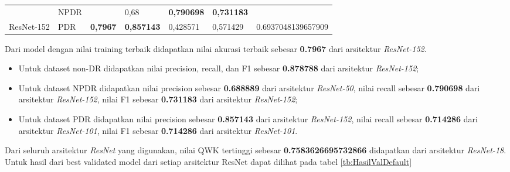 \begin{table}[hbtp]
\begin{center}
\begin{tabular}{|c|l|c|l|l|l|c|}
			& NPDR                                               &                          & 0,68                                              & \textbf{0,790698}                                         & \textbf{0,731183}                                        &                                      \\ \cline{2-2} \cline{4-6}
			\multirow{-3}{*}{ResNet-152} & PDR                                                & \multirow{-3}{*}{\textbf{0,7967}} & \textbf{0,857143}                                          & 0,428571                                         & 0,571429                                        & \multirow{-3}{*}{0.6937048139657909} \\ \hline
		\end{tabular}
	\end{center}
\end{table}

Dari model dengan nilai training terbaik didapatkan nilai akurasi terbaik sebesar \textbf{0.7967} dari arsitektur \emph{ResNet-152}.

\begin{itemize}

\item Untuk dataset non-DR didapatkan nilai precision, recall, dan F1 sebesar \textbf{0.878788} dari arsitektur \emph{ResNet-152};

\item Untuk dataset NPDR didapatkan nilai precision sebesar \textbf{0.688889} dari arsitektur \emph{ResNet-50}, nilai recall sebesar \textbf{0.790698} dari arsitektur \emph{ResNet-152}, nilai F1 sebesar \textbf{0.731183} dari arsitektur \emph{ResNet-152};

\item Untuk dataset PDR didapatkan nilai precision sebesar \textbf{0.857143} dari arsitektur \emph{ResNet-152}, nilai recall sebesar \textbf{0.714286} dari arsitektur \emph{ResNet-101}, nilai F1 sebesar \textbf{0.714286} dari arsitektur \emph{ResNet-101}.

\end{itemize}

Dari seluruh arsitektur \emph{ResNet} yang digunakan, nilai QWK tertinggi sebesar \textbf{0.7583626695732866} didapatkan dari arsitektur \emph{ResNet-18}. Untuk hasil dari best validated model dari setiap arsitektur ResNet dapat dilihat pada tabel \ref{tb:HasilValDefault}

\pagebreak

